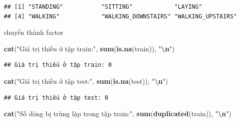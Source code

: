 \documentclass[
]{article}
\newenvironment{Shaded}{\begin{snugshade}}{\end{snugshade}}
\newcommand{\FunctionTok}[1]{\textcolor[rgb]{0.13,0.29,0.53}{\textbf{#1}}}
\newcommand{\NormalTok}[1]{#1}
\newcommand{\OtherTok}[1]{\textcolor[rgb]{0.56,0.35,0.01}{#1}}
\newcommand{\SpecialCharTok}[1]{\textcolor[rgb]{0.81,0.36,0.00}{\textbf{#1}}}
\newcommand{\StringTok}[1]{\textcolor[rgb]{0.31,0.60,0.02}{#1}}
\begin{document}
\begin{verbatim}
## [1] "STANDING"           "SITTING"            "LAYING"            
## [4] "WALKING"            "WALKING_DOWNSTAIRS" "WALKING_UPSTAIRS"
\end{verbatim}

chuyển thành factor

\begin{Shaded}
\end{Shaded}

\begin{Shaded}
\begin{Highlighting}[]
\FunctionTok{cat}\NormalTok{(}\StringTok{"Giá trị thiếu ở tập train:"}\NormalTok{, }\FunctionTok{sum}\NormalTok{(}\FunctionTok{is.na}\NormalTok{(train)), }\StringTok{"}\SpecialCharTok{\textbackslash{}n}\StringTok{"}\NormalTok{)}
\end{Highlighting}
\end{Shaded}

\begin{verbatim}
## Giá trị thiếu ở tập train: 0
\end{verbatim}

\begin{Shaded}
\begin{Highlighting}[]
\FunctionTok{cat}\NormalTok{(}\StringTok{"Giá trị thiếu ở tập test:"}\NormalTok{, }\FunctionTok{sum}\NormalTok{(}\FunctionTok{is.na}\NormalTok{(test)), }\StringTok{"}\SpecialCharTok{\textbackslash{}n}\StringTok{"}\NormalTok{)}
\end{Highlighting}
\end{Shaded}

\begin{verbatim}
## Giá trị thiếu ở tập test: 0
\end{verbatim}

\begin{Shaded}
\begin{Highlighting}[]
\FunctionTok{cat}\NormalTok{(}\StringTok{"Số dòng bị trùng lặp trong tập train:"}\NormalTok{, }\FunctionTok{sum}\NormalTok{(}\FunctionTok{duplicated}\NormalTok{(train)), }\StringTok{"}\SpecialCharTok{\textbackslash{}n}\StringTok{"}\NormalTok{)}
\end{Highlighting}
\end{Shaded}
\end{document}
